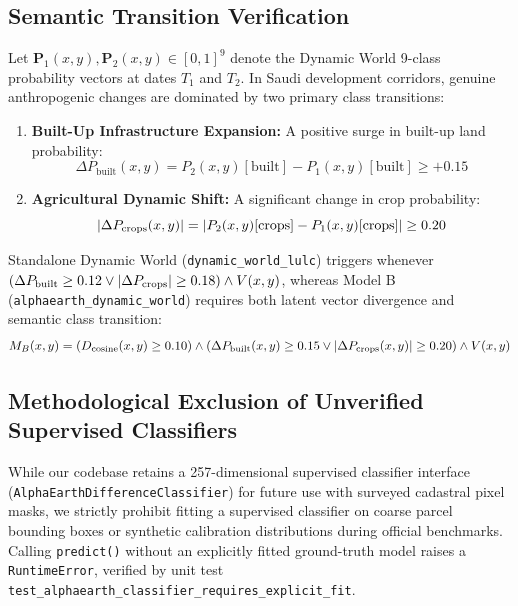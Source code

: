 \subsection{Semantic Transition Verification}
Let $\mathbf{P}_1(x, y), \mathbf{P}_2(x, y) \in [0, 1]^9$ denote the Dynamic World 9-class probability vectors at dates $T_1$ and $T_2$. In Saudi development corridors, genuine anthropogenic changes are dominated by two primary class transitions:
\begin{enumerate}
    \item \textbf{Built-Up Infrastructure Expansion:} A positive surge in built-up land probability:
    \begin{equation}
        \Delta P_{\text{built}}(x, y) = P_2(x, y)[\text{built}] - P_1(x, y)[\text{built}] \ge +0.15
        \label{eq:dw_built_delta}
    \end{equation}
    \item \textbf{Agricultural Dynamic Shift:} A significant change in crop probability:
    \begin{equation}
        \left\lvert\Delta P_{\text{crops}}(x, y)\right\rvert = \left\lvert P_2(x, y)[\text{crops}] - P_1(x, y)[\text{crops}]\right\rvert \ge 0.20
        \label{eq:dw_crop_delta}
    \end{equation}
\end{enumerate}
Standalone Dynamic World (\texttt{dynamic\_world\_lulc}) triggers whenever $(\Delta P_{\text{built}} \ge 0.12 \lor \left\lvert\Delta P_{\text{crops}}\right\rvert \ge 0.18) \land V(x,y)$, whereas Model B (\texttt{alphaearth\_dynamic\_world}) requires both latent vector divergence and semantic class transition:
\begin{equation}
    M_B(x, y) = \left( D_{\text{cosine}}(x, y) \ge 0.10 \right) \land \left( \Delta P_{\text{built}}(x, y) \ge 0.15 \lor \left\lvert\Delta P_{\text{crops}}(x, y)\right\rvert \ge 0.20 \right) \land V(x, y)
    \label{eq:mask_model_b}
\end{equation}

\subsection{Methodological Exclusion of Unverified Supervised Classifiers}
While our codebase retains a 257-dimensional supervised classifier interface (\texttt{AlphaEarthDifferenceClassifier}) for future use with surveyed cadastral pixel masks, we strictly prohibit fitting a supervised classifier on coarse parcel bounding boxes or synthetic calibration distributions during official benchmarks. Calling \texttt{predict()} without an explicitly fitted ground-truth model raises a \texttt{RuntimeError}, verified by unit test \texttt{test\_alphaearth\_classifier\_requires\_explicit\_fit}.


